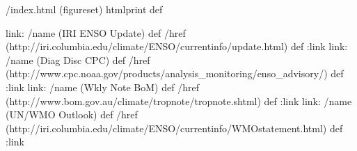 /index.html {(figureset) htmlprint} def
\begin{ingrid}
link:
/name (IRI ENSO Update) def /href (http://iri.columbia.edu/climate/ENSO/currentinfo/update.html) def
:link
link:
/name (Diag Disc CPC) def
/href (http://www.cpc.noaa.gov/products/analysis_monitoring/enso_advisory/) def
:link
link:
/name (Wkly Note BoM) def
/href (http://www.bom.gov.au/climate/tropnote/tropnote.shtml) def
:link
link:
/name (UN/WMO Outlook) def
/href (http://iri.columbia.edu/climate/ENSO/currentinfo/WMOstatement.html) def
:link
\end{ingrid}